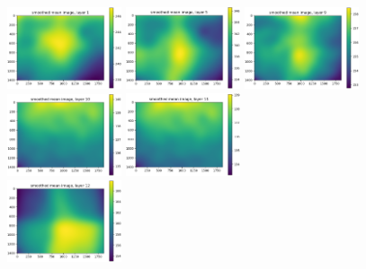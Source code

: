 \documentclass[letterpaper,11pt]{article}
\begin{document}
\begin{figure}[!ht]
\centering
\includegraphics[width=0.3\textwidth]{images/results/smoothed_mean_image_layers_polaris/smoothed_mean_image_layer_1}
\includegraphics[width=0.3\textwidth]{images/results/smoothed_mean_image_layers_polaris/smoothed_mean_image_layer_5}
\includegraphics[width=0.3\textwidth]{images/results/smoothed_mean_image_layers_polaris/smoothed_mean_image_layer_9}
\includegraphics[width=0.3\textwidth]{images/results/smoothed_mean_image_layers_polaris/smoothed_mean_image_layer_10}
\includegraphics[width=0.3\textwidth]{images/results/smoothed_mean_image_layers_polaris/smoothed_mean_image_layer_11} \\
\includegraphics[width=0.3\textwidth]{images/results/smoothed_mean_image_layers_polaris/smoothed_mean_image_layer_12}

\end{figure}
\end{document}
